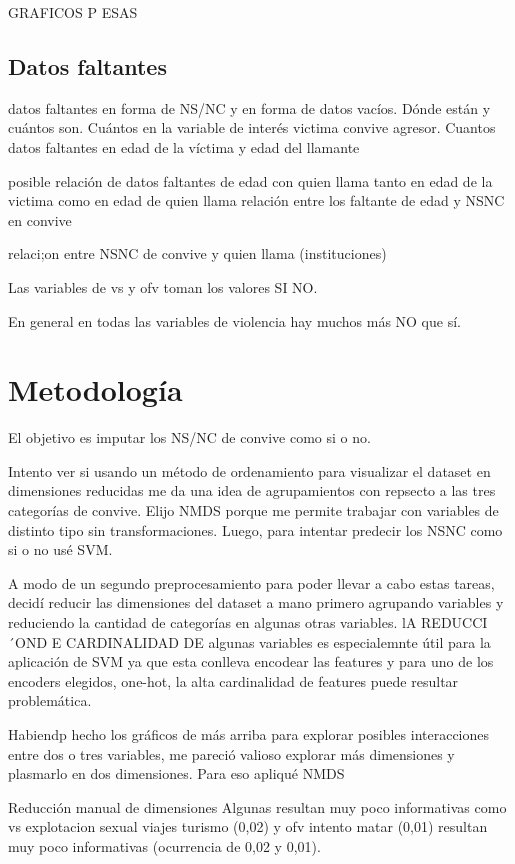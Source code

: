 \documentclass[10 pt]{article}
\begin{document}
GRAFICOS P ESAS



\subsection*{Datos faltantes}\label{faltantes}

datos faltantes en forma de NS/NC y en forma de datos vacíos. Dónde están y cuántos son. Cuántos en la variable de interés victima convive agresor. 
Cuantos datos faltantes en edad de la víctima y edad del llamante

posible relación de datos faltantes de edad con quien llama tanto en edad de la victima como en edad de quien llama
relación entre los faltante de edad y NSNC en convive

relaci;on entre NSNC de convive y quien llama (instituciones)

Las variables de vs y ofv toman los valores SI NO.

En general en todas las variables de violencia hay muchos más NO que sí.


\section*{Metodología}\label{met}

El objetivo es imputar los NS/NC de convive como si o no. 

Intento ver si usando un método de ordenamiento para visualizar el dataset en dimensiones reducidas me da una
idea de agrupamientos con repsecto a las tres categorías de convive. Elijo NMDS porque me permite trabajar con
variables de distinto tipo sin transformaciones.
 Luego, para intentar predecir los NSNC como si o no usé SVM. 

A modo de un segundo preprocesamiento para poder llevar a cabo estas tareas, decidí reducir las dimensiones del dataset a mano primero agrupando variables y reduciendo la cantidad de categorías en algunas otras variables. lA REDUCCI´OND E CARDINALIDAD DE algunas variables es especialemnte útil para la aplicación de SVM ya que esta conlleva encodear las features y para uno de los encoders elegidos, one-hot, la alta cardinalidad de features puede resultar problemática.


Habiendp hecho los gráficos de más arriba para explorar posibles interacciones entre dos o tres variables, me pareció valioso explorar más dimensiones y plasmarlo en dos dimensiones. Para eso apliqué NMDS

Reducción manual de dimensiones
Algunas resultan muy poco informativas como vs explotacion sexual viajes turismo (0,02) y ofv intento matar (0,01) resultan muy poco informativas (ocurrencia de 0,02 y 0,01). 
\end{document}
